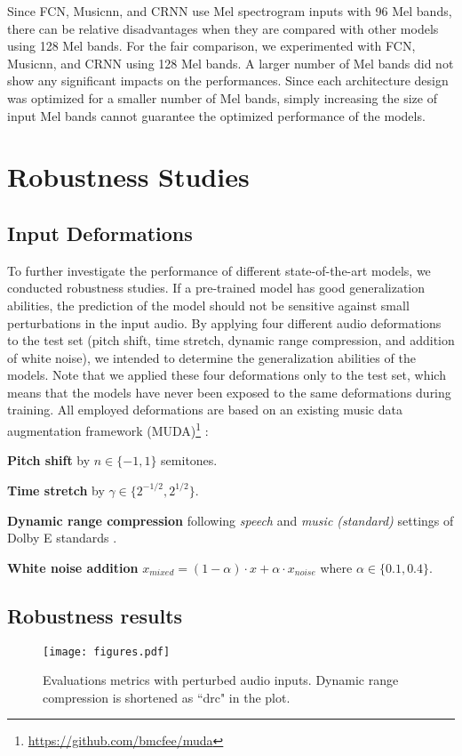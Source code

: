 \documentclass{article}
\begin{document}
Since FCN, Musicnn, and CRNN use Mel spectrogram inputs with 96 Mel bands, there can be relative disadvantages when they are compared with other models using 128 Mel bands. For the fair comparison, we experimented with FCN, Musicnn, and CRNN using 128 Mel bands. A larger number of Mel bands did not show any significant impacts on the performances. Since each architecture design was optimized for a smaller number of Mel bands, simply increasing the size of input Mel bands cannot guarantee the optimized performance of the models.




%
 \section{Robustness Studies}\label{sec:robustness}
\subsection{Input Deformations}
To further investigate the performance of different state-of-the-art models, we conducted robustness studies. If a pre-trained model has good generalization abilities, the prediction of the model should not be sensitive against small perturbations in the input audio. By applying four different audio deformations to the test set (pitch shift, time stretch, dynamic range compression, and addition of white noise), we intended to determine the generalization abilities of the models. Note that we applied these four deformations only to the test set, which means that the models have never been exposed to the same deformations during training. All employed deformations are based on an existing music data augmentation framework (MUDA)\footnote{\url{https://github.com/bmcfee/muda}} \cite{mcfee2015software}:

\noindent\textbf{Pitch shift} by $n \in \{-1, 1\}$ semitones.

\noindent\textbf{Time stretch} by $\gamma \in \{2^{-1/2}, 2^{1/2}\}$.

\noindent\textbf{Dynamic range compression} following \textit{speech} and \textit{music (standard)} settings of Dolby E standards \cite{dolby2002standards}.

\noindent\textbf{White noise addition} $x_{mixed} = (1 - \alpha) \cdot x + \alpha \cdot x_{noise}$ where $\alpha \in \{0.1, 0.4\}$.





\subsection{Robustness results}
\begin{figure*}[t!]
    \centering
    \texttt{[image: figures.pdf]} 
    \caption{Evaluations metrics with perturbed audio inputs. Dynamic range compression is shortened as ``drc" in the plot.}
    \label{fig:robustness}
\end{figure*}
\end{document}
